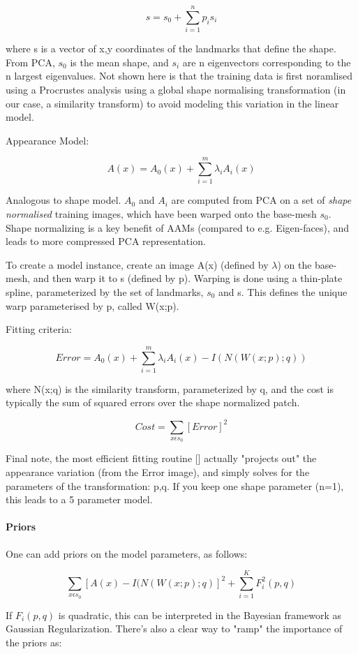 \documentclass[10pt,twocolumn,letterpaper]{article}
\begin{document}
\[s = s_0 + \sum_{i=1}^n p_i s_i\]

where s is a vector of x,y coordinates of the landmarks that define the shape.  From PCA, $s_0$ is the mean shape, and $s_i$ are n eigenvectors corresponding to the n largest eigenvalues.  Not shown here is that the training data is first noramlised using a Procrustes analysis using a global shape normalising transformation (in our case, a similarity transform) to avoid modeling this variation in the linear model.

Appearance Model:

\[A(x) = A_0(x) + \sum_{i=1}^m \lambda_i A_i(x)\]

Analogous to shape model. $A_0$ and $A_i$ are computed from PCA on a set of \emph{shape normalised} training images, which have been warped onto the base-mesh $s_0$.  Shape normalizing is a key benefit of AAMs (compared to e.g. Eigen-faces), and leads to more compressed PCA representation.

To create a model instance, create an image A(x) (defined by $\lambda$) on the base-mesh, and then warp it to s (defined by p).  Warping is done using a thin-plate spline, parameterized by the set of landmarks, $s_0$ and s.  This defines the unique warp parameterised by p, called W(x;p).

Fitting criteria:

\[Error = A_0(x) + \sum_{i=1}^m \lambda_i A_i(x) - I(N(W(x;p);q)) \]

where N(x;q) is the similarity transform, parameterized by q, and the cost is typically the sum of squared errors over the shape normalized patch.

\[Cost = \sum_{x \epsilon s_0} [Error]^2 \]

Final note, the most efficient fitting routine [] actually "projects out" the appearance variation (from the Error image), and simply solves for the parameters of the transformation: p,q.  If you keep one shape parameter (n=1), this leads to a 5 parameter model.

\paragraph{Priors}

One can add priors on the model parameters, as follows:

\[ \sum_{x \epsilon s_0} [A(x) - I(N(W(x;p);q)]^2 + \sum_{i=1}^K F_i^2(p,q) \]

If $F_i(p,q)$ is quadratic, this can be interpreted in the Bayesian framework as Gaussian Regularization.  There's also a clear way to "ramp" the importance of the priors as:
\end{document}
